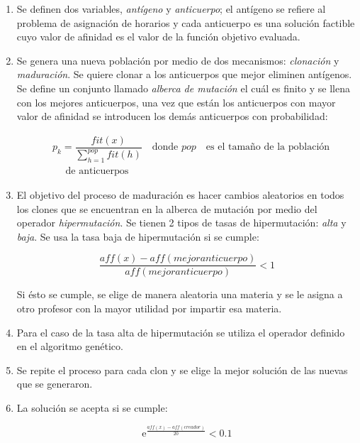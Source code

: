 \documentclass[12pt,spanish]{report}
\begin{document}
\begin{itemize}
\begin{enumerate}
\item Se definen dos variables, \textit{antígeno} y \textit{anticuerpo}; el antígeno se refiere al problema de asignación de horarios y cada anticuerpo es una solución factible cuyo valor de afinidad es el valor de la función objetivo evaluada.

\item Se genera una nueva población por medio de dos mecanismos: \textit{clonación} y \textit{maduración}. Se quiere clonar a los anticuerpos que mejor eliminen antígenos. Se define un conjunto llamado \textit{alberca de mutación} el cuál es finito y se llena con los mejores anticuerpos, una vez que están los anticuerpos con mayor valor de afinidad se introducen los demás anticuerpos con probabilidad:
  
\begin{equation*}
\begin{split}
&p_{k} = \dfrac{fit(x)}{\displaystyle \sum_{h = 1}^{pop} fit(h)} \,\,\,\, \text{ donde } pop \,\,\,\, \text{ es el tamaño de la población}\\
&\quad \text{ de anticuerpos}
\end{split}
\end{equation*}


\item El objetivo del proceso de maduración es hacer cambios aleatorios en todos los clones que se encuentran en la alberca de mutación por medio del operador \textit{hipermutación}. Se tienen 2 tipos de tasas de hipermutación: \textit{alta} y \textit{baja}. Se usa la tasa baja de hipermutación si se cumple:
  
  \begin{equation*}
\dfrac{aff(x) - aff(mejor anticuerpo)}{aff(mejor anticuerpo)} < 1
\end{equation*}

Si ésto se cumple, se elige de manera aleatoria una materia y se le asigna a otro profesor con la mayor utilidad por impartir esa materia.

\item  Para el caso de la tasa alta de hipermutación se utiliza el operador definido en el algoritmo genético.

\item Se repite el proceso para cada clon y se elige la mejor solución de las nuevas que se generaron.

\item La solución se acepta si se cumple:
  
  \begin{equation*}
\mathrm{e}^{\frac{aff(x) - aff(creador)}{20}} < 0.1
\end{equation*}

\end{enumerate}

\end{itemize}
\end{document}
